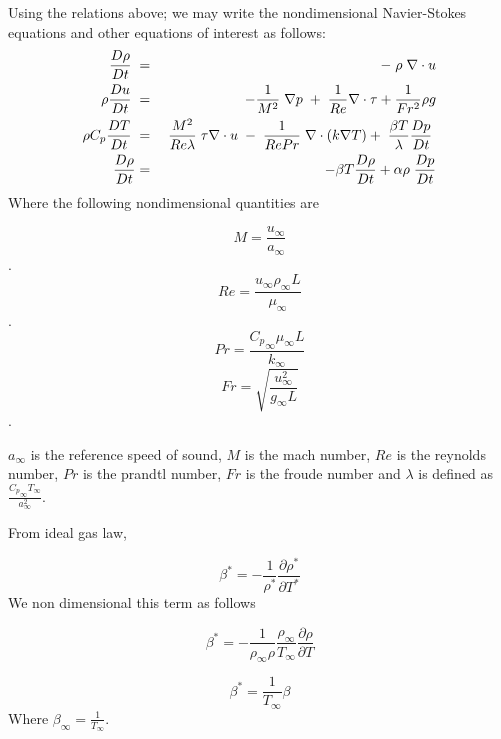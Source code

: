 Using the relations above; we may write the nondimensional
Navier-Stokes equations and other equations of interest as follows:
\begin{eqnarray}
\frac{D \rho}{D t}\hspace{1mm} &=& -\hspace{1mm}\rho \hspace{1mm}\nabla \cdot u \\
\rho \frac{D u}{D t} \hspace{1mm} &=& -\frac{1}{M^2}\hspace{1mm}\nabla p\hspace{1mm}+\hspace{1mm}\frac{1}{Re}\nabla \cdot \tau + \frac{1}{Fr^2}\rho g \\
\rho C_p \frac{D T}{D t} \hspace{1mm}&=&\hspace{1mm} \frac{M^2}{Re \lambda}\hspace{1mm}\tau \nabla \cdot u \hspace{1mm}-\hspace{1mm}\frac{1}{Re Pr} \hspace{1mm}\nabla \cdot (k \nabla T) + \hspace{1mm} \frac{\beta T}{\lambda} \frac{D p}{D t}\hspace{1mm} \\
\frac{D \rho}{D t} &=& \hspace{1mm} - \beta T \frac{D \rho}{D t} + \alpha \rho \hspace{1mm}\frac{D p}{D t}
\end{eqnarray}
Where the following nondimensional quantities are

$$M= \frac{u_\infty}{a_\infty}$$. 
$$Re= \frac{u_\infty \rho_\infty L}{\mu_\infty}$$. 
$$Pr= \frac{{C_p}_\infty \mu_\infty L}{k_\infty}$$
$$Fr= \sqrt{\frac{u_\infty^2} {g_\infty L}}$$. 

\noindent $a_{\infty}$ is the reference speed of sound, $M$ is the mach number, $Re$ is the reynolds number, $Pr$ is the prandtl number, $Fr$ is the froude number and $\lambda$ is defined as $\frac{{C_p}_\infty T_\infty }{a^2_\infty}$. 

\noindent From ideal gas law, 

$$\beta^*= -\frac{1}{\rho^*}\frac{\partial \rho^*}{\partial T^*}$$ We non dimensional this term as follows 

$$\beta^*= -\frac{1}{\rho_\infty \rho}\frac{\rho_\infty}{T_\infty}\frac{\partial \rho}{\partial T}$$

$$\beta^*= \frac{1}{T_\infty } \beta$$ Where $\beta_\infty = \frac{1}{T_\infty}$. 
\bigskip

